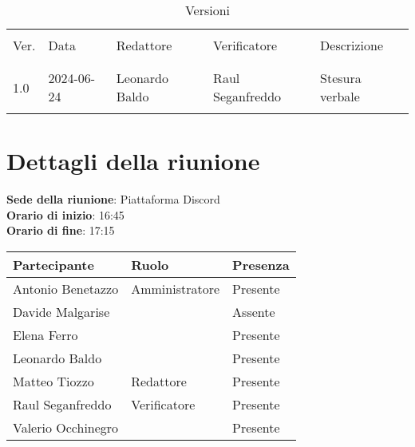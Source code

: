 \documentclass[italian,12pt]{article}
\begin{document}
\newcommand{\mySkip}[1][]{#1}



\newpage



\begin{table}[!h]
	\caption{Versioni}
	\footnotesize
	\begin{center}
		\begin{tabular}{ l l l l p{6cm} }
			\hline                                                                      \\[-2ex]
			Ver. & Data       & Redattore        & Verificatore       & Descrizione     \\
			\\[-2ex] \hline \\[-1.5ex]
			1.0  & 2024-06-24 & Leonardo Baldo   & Raul Seganfreddo   & Stesura verbale \\
			\\[-1.5ex] \hline
		\end{tabular}
	\end{center}
\end{table}

\newpage

\tableofcontents

\newpage

\section{Dettagli della riunione}

\textbf{Sede della riunione}: Piattaforma Discord\\
\textbf{Orario di inizio}: 16:45\\
\textbf{Orario di fine}: 17:15\\

\begin{flushleft}
	\begin{table}[!h]
		\begin{tabular}{ |l|l|l| }
			\hline
			\textbf{Partecipante} & \textbf{Ruolo} & \textbf{Presenza} \\
			\hline
			Antonio Benetazzo     & Amministratore & Presente          \\
			Davide Malgarise      &                & Assente           \\
			Elena Ferro           &                & Presente          \\
			Leonardo Baldo        &                & Presente          \\
			Matteo Tiozzo         & Redattore      & Presente          \\
			Raul Seganfreddo      & Verificatore   & Presente          \\
			Valerio Occhinegro    &                & Presente          \\
			\hline
		\end{tabular}
	\end{table}
\end{flushleft}
\end{document}
